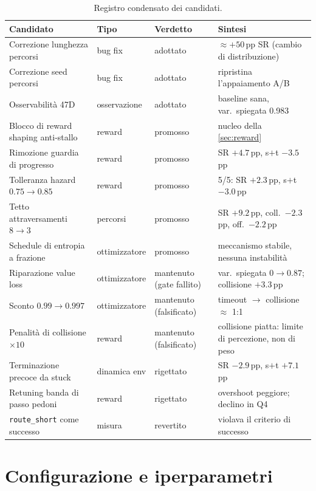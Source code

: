\begin{table}[!htbp]
  \centering\small
  \caption{Registro condensato dei candidati.}
  \label{tab:candidati}
  \begin{tabular}{@{}L{4.5cm}L{2.6cm}L{2.6cm}L{4.3cm}@{}}
    \toprule
    Candidato & Tipo & Verdetto & Sintesi \\
    \midrule
    Correzione lunghezza percorsi & bug fix & adottato & $\approx +50$\,pp SR (cambio di distribuzione) \\
    Correzione seed percorsi & bug fix & adottato & ripristina l'appaiamento A/B \\
    Osservabilità 47D & osservazione & adottato & baseline sana, var.\ spiegata 0.983 \\
    Blocco di reward shaping anti-stallo & reward & promosso & nucleo della \cref{sec:reward} \\
    Rimozione guardia di progresso & reward & promosso & SR $+4.7$\,pp, s$+$t $-3.5$\,pp \\
    Tolleranza hazard $0.75 \to 0.85$ & reward & promosso & 5/5: SR $+2.3$\,pp, s$+$t $-3.0$\,pp \\
    Tetto attraversamenti $8 \to 3$ & percorsi & promosso & SR $+9.2$\,pp, coll.\ $-2.3$\,pp, off.\ $-2.2$\,pp \\
    Schedule di entropia a frazione & ottimizzatore & promosso & meccanismo stabile, nessuna instabilità \\
    Riparazione value loss & ottimizzatore & mantenuto (gate fallito) & var.\ spiegata $0 \to 0.87$; collisione $+3.3$\,pp \\
    Sconto $0.99 \to 0.997$ & ottimizzatore & mantenuto (falsificato) & timeout $\to$ collisione $\approx$ 1:1 \\
    Penalità di collisione $\times 10$ & reward & mantenuto (falsificato) & collisione piatta: limite di percezione, non di peso \\
    Terminazione precoce da stuck & dinamica env & rigettato & SR $-2.9$\,pp, s$+$t $+7.1$\,pp \\
    Retuning banda di passo pedoni & reward & rigettato & overshoot peggiore; declino in Q4 \\
    \texttt{route\_short} come successo & misura & revertito & violava il criterio di successo \\
    \bottomrule
  \end{tabular}
\end{table}

\chapter{Configurazione e iperparametri}
\label{app:config}

